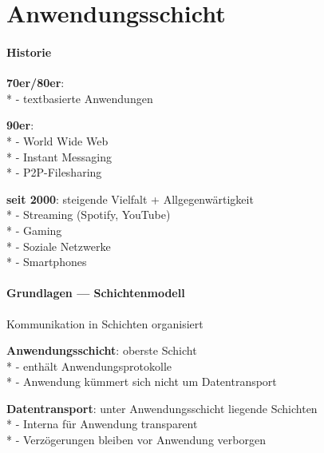 \section{Anwendungsschicht}

\paragraph{Historie}
\begin{items}
  \item \textbf{70er/80er}: \\*
    - textbasierte Anwendungen
  \item \textbf{90er}: \\*
    - World Wide Web \\*
    - Instant Messaging \\*
    - P2P-Filesharing
  \item \textbf{seit 2000}: steigende Vielfalt + Allgegenwärtigkeit \\*
    - Streaming (Spotify, YouTube) \\*
    - Gaming \\*
    - Soziale Netzwerke \\*
    - Smartphones
\end{items}

\paragraph{Grundlagen --- Schichtenmodell}
\begin{items}
  \item Kommunikation in Schichten organisiert
  \item \textbf{Anwendungsschicht}: oberste Schicht \\*
    - enthält Anwendungsprotokolle \\*
    - Anwendung kümmert sich nicht um Datentransport
  \item \textbf{Datentransport}: unter Anwendungsschicht liegende Schichten \\*
    - Interna für Anwendung transparent \\*
    - Verzögerungen bleiben vor Anwendung verborgen
\end{items}

